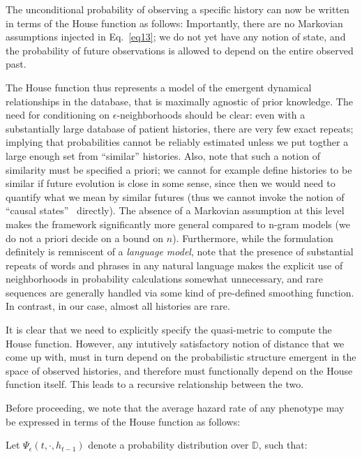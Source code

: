 \documentclass[twocolumn, compsoc,9pt]{IEEEtran}
\newcommand{\D}{\mathbb{D}}
\newcommand{\T}{\mathcal{T}}
\begin{document}
{The unconditional probability of observing a specific history can now be written in terms of the House function as follows:
Importantly, there are no Markovian assumptions injected in Eq.~\eqref{eq13}; we do not yet have any notion of state, and the probability of future observations is allowed to depend on the entire observed past. 

The House function  thus represents a model of the 
emergent dynamical relationships in the database, that is maximally agnostic of prior knowledge. The need for conditioning on $\epsilon$-neighborhoods should be clear: even with a substantially large database of patient histories, there are very few exact repeats; implying that probabilities cannot be reliably estimated unless we put togther a large enough set from ``similar'' histories. Also, note that such a notion of similarity must be specified a priori; we cannot for example define histories to be similar if future evolution is close in some sense, since then we would need to quantify what we mean by similar futures (thus we cannot invoke the notion of ``causal states''~\cite{CL12g} directly). The absence of a Markovian assumption at this level makes the framework significantly  more general compared to n-gram models (we do not a priori decide on a bound on $n$). Furthermore, while the formulation definitely is remniscent of a \textit{language model}, note that the presence of substantial repeats of words and phrases in any natural language makes the explicit use of neighborhoods in probability calculations somewhat unnecessary, and rare sequences are generally handled via some kind of  pre-defined smoothing function. In contrast, in our case, almost all histories are rare.

It is clear that we need to explicitly specify the quasi-metric to compute the House function. However, any intutively satisfactory notion of distance that we come up with, must in turn  depend on the probabilistic structure emergent in the space of observed histories, and therefore must functionally depend on the House function itself. This leads to a recursive relationship between the two.

Before proceeding, we note that the average hazard rate  of any phenotype may be expressed in terms of the House function as follows:
%
\cgather{
\forall d \in \D, \zeta(d) = \frac{1}{\T}\sum_{t\in \T} \lim_{\epsilon \rightarrow \infty} \Psi(t,d,[h_t]_\epsilon)
}
%

\begin{notn}
Let $\Psi_\epsilon(t,\cdot,h_{t-1})$ denote a probability distribution over $\D$, such that:
\cgather{
\forall j \in \D, \Psi_\epsilon(t,\cdot,h_{t-1}) \big \vert_j = \Psi_\epsilon(t,j,h_{t-1})
}
\end{notn}

}
\end{document}
